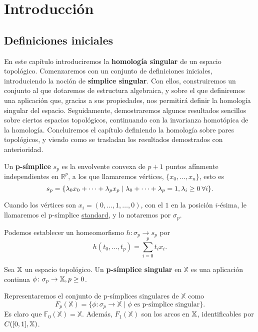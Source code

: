 \chapter{Introducción}\label{ch:introduccion}

\section{Definiciones iniciales}

En este capítulo introduciremos la \textbf{homología singular} de un espacio topológico. Comenzaremos con
un conjunto de definiciones iniciales, introduciendo la noción de \textbf{símplice singular}. Con ellos,
construiremos un conjunto al que dotaremos de estructura algebraica, y sobre el que definiremos una aplicación
que, gracias a sus propiedades, nos permitirá definir la homología singular del espacio. Seguidamente,
demostraremos algunos resultados sencillos sobre ciertos espacios topológicos, continuando con la invarianza
homotópica de la homología. Concluiremos el capítulo definiendo la homología sobre pares topológicos, y
viendo como se trasladan los resultados demostrados con anterioridad.

\begin{definition}
Un \textbf{p-símplice} $s_p$ es la envolvente convexa de $p+1$ puntos afínmente independientes en $\mathbb{R}^p$,
a los que llamaremos vértices, $\{x_0, \dots, x_n\}$, esto es
\[ s_p = \{\lambda_0 x_0 + \dots + \lambda_p x_p \mid \lambda_0 + \dots + \lambda_p = 1, \lambda_i \geq 0 \hspace{0.2em} \forall i \}. \]
\end{definition}
Cuando los vértices son $x_i = (0, \dots, 1, \dots, 0)$, con el $1$ en la posición $i$-ésima, le llamaremos el p-símplice \underline{standard},
y lo notaremos por $\sigma_p$.

Podemos establecer un homeomorfismo $h \colon \sigma_p \to s_p$ por
\[ h(t_0, \dots, t_p) = \sum\limits_{i = 0}^p t_i x_i. \]

\begin{definition}
Sea ${\mathbb X}$ un espacio topológico. Un \textbf{p-símplice singular} en $\mathbb{X}$ es una aplicación continua $\phi \colon \sigma_p \to {\mathbb X}, p \geq 0$.
\end{definition}

Representaremos el conjunto de p-símplices singulares de $\mathbb{X}$ como
\[F_p(\mathbb{X}) = \{\phi \colon \sigma_p \to \mathbb{X} \mid \phi \text{ es p-símplice singular}\}.\]
Es claro que $\mathbb{F}_0(\mathbb{X}) = \mathbb{X}$. Además, $F_1(\mathbb{X})$ son los arcos en ${\mathbb X}$, identificables por
$\mathbb \mathcal{C}([0,1], {\mathbb X})$.

